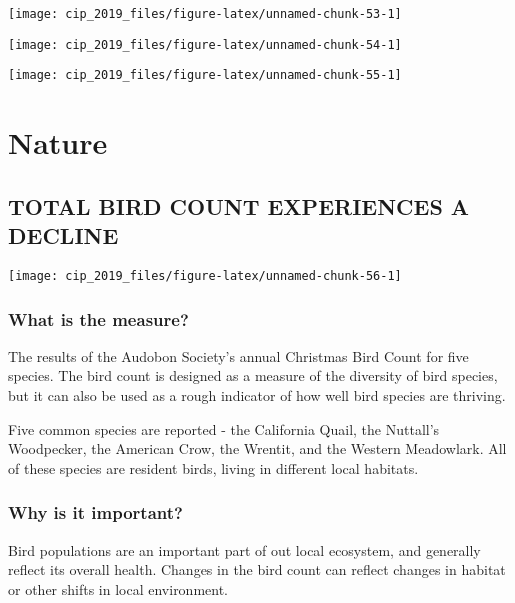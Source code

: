 \documentclass[]{book}
\theoremstyle{definition}
\theoremstyle{definition}
\theoremstyle{definition}
\theoremstyle{remark}
\begin{document}
\texttt{[image: cip\_2019\_files/figure-latex/unnamed-chunk-53-1]}

\texttt{[image: cip\_2019\_files/figure-latex/unnamed-chunk-54-1]}

\begin{center}\texttt{[image: cip\_2019\_files/figure-latex/unnamed-chunk-55-1]} \end{center}

\section*{Nature}\label{nature}

\subsection*{TOTAL BIRD COUNT EXPERIENCES A
DECLINE}\label{total-bird-count-experiences-a-decline}

\texttt{[image: cip\_2019\_files/figure-latex/unnamed-chunk-56-1]}

\subsubsection*{What is the measure?}\label{what-is-the-measure-28}

The results of the Audobon Society's annual Christmas Bird Count for
five species. The bird count is designed as a measure of the diversity
of bird species, but it can also be used as a rough indicator of how
well bird species are thriving.

Five common species are reported - the California Quail, the Nuttall's
Woodpecker, the American Crow, the Wrentit, and the Western Meadowlark.
All of these species are resident birds, living in different local
habitats.

\subsubsection*{Why is it important?}\label{why-is-it-important-26}

Bird populations are an important part of out local ecosystem, and
generally reflect its overall health. Changes in the bird count can
reflect changes in habitat or other shifts in local environment.
\end{document}

